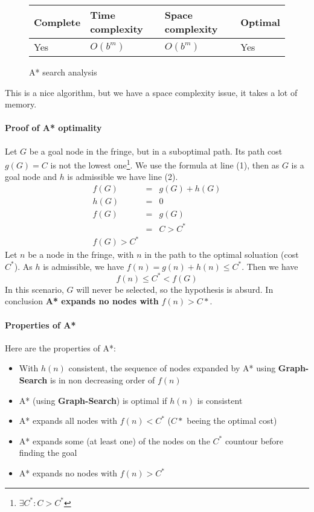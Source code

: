 \begin{figure}[h]
\centering
\begin{tabular}{|llll|}
\hline
\textbf{Complete} & \textbf{Time complexity} & \textbf{Space complexity} & \textbf{Optimal} \\
\hline
Yes & $O(b^m)$ & $O(b^m)$ & Yes\\
\hline
\end{tabular}
\caption{A* search analysis}
\end{figure}

This is a nice algorithm, but we have a space complexity issue, it takes a lot of memory.

\paragraph{Proof of A* optimality}

Let $G$ be a goal node in the fringe, but in a suboptimal path. Its path cost $g(G)=C$ is not the lowest one\footnote{$\exists C^* : C > C^*$}. We use the formula at line (1), then as $G$ is a goal node and $h$ is admissible we have line (2). 
\begin{eqnarray}
f(G) &=& g(G) + h(G)\\
h(G) &=& 0\\
f(G) &=& g(G)\\
&=& C > C^*\\
f(G) > C^*
\end{eqnarray}
Let $n$ be a node in the fringe, with $n$ in the path to the optimal soluation (cost $C^*$). As $h$ is admissible, we have $f(n) = g(n) + h(n) \leq C^*$. Then we have
$$f(n) \leq C^* < f(G)$$
In this scenario, $G$ will never be selected, so the hypothesis is absurd. In conclusion \textbf{A* expands no nodes with} $f(n) > C*$.
\paragraph{Properties of A*}

Here are the properties of A*:
\begin{itemize}
\item With $h(n)$ consistent, the sequence of nodes expanded by A* using \textbf{Graph-Search} is in non decreasing order of $f(n)$
\item A* (using \textbf{Graph-Search}) is optimal if $h(n)$ is consistent
\item A* expands all nodes with $f(n) < C^*$ ($C*$ beeing the optimal cost)
\item A* expands some (at least one) of the nodes on the $C^*$ countour before finding the goal
\item A* expands no nodes with $f(n) > C^*$ 
\end{itemize}

